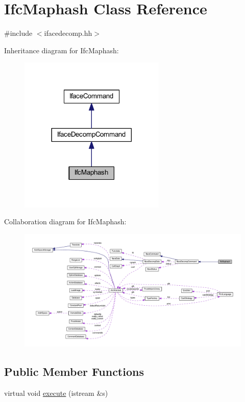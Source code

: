 \hypertarget{class_ifc_maphash}{}\section{Ifc\+Maphash Class Reference}
\label{class_ifc_maphash}


{\ttfamily \#include $<$ifacedecomp.\+hh$>$}



Inheritance diagram for Ifc\+Maphash\+:
\nopagebreak
\begin{figure}[H]
\begin{center}
\leavevmode
\includegraphics[width=197pt]{class_ifc_maphash__inherit__graph}
\end{center}
\end{figure}


Collaboration diagram for Ifc\+Maphash\+:
\nopagebreak
\begin{figure}[H]
\begin{center}
\leavevmode
\includegraphics[width=350pt]{class_ifc_maphash__coll__graph}
\end{center}
\end{figure}
\subsection*{Public Member Functions}
\begin{DoxyCompactItemize}
\item 
virtual void \mbox{\hyperlink{class_ifc_maphash_ae57da41dbb958189c2b6101ecfdc3293}{execute}} (istream \&s)
\end{DoxyCompactItemize}
